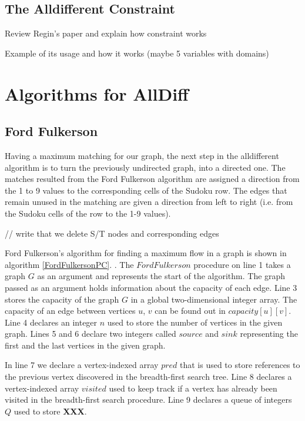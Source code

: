 \documentclass{l4proj}
\begin{document}
\section{The Alldifferent Constraint}
\noindent Review Regin’s paper and explain how constraint works \cite{regin1994filtering}

\noindent Example of  its usage and how it works (maybe 5 variables with domains)

 
\chapter{Algorithms for AllDiff}
\section{Ford Fulkerson}
Having a maximum matching for our graph, the next step in the alldifferent algorithm is to turn the previously undirected graph, into a directed one. The matches resulted from the Ford Fulkerson algorithm are assigned a direction from the 1 to 9 values to the corresponding cells of the Sudoku row. The edges that remain unused in the matching are given a direction from left to right (i.e. from the Sudoku cells of the row to the 1-9 values).

\noindent // write that we delete S/T nodes and corresponding edges

\noindent Ford Fulkerson's algorithm for finding a maximum flow in a graph is shown in algorithm \ref{FordFulkersonPC}. \cite{ford1956maximal}. The $Ford Fulkerson$ procedure on line 1 takes a graph $G$ as an argument and represents the start of the algorithm. The graph passed as an argument holds information about the capacity of each edge. Line 3 stores the capacity of the graph $G$ in a global two-dimensional integer array. The capacity of an edge between vertices $u$, $v$ can be found out in $capacity[u][v]$. Line 4 declares an integer $n$ used to store the number of vertices in the given graph. Lines 5 and 6 declare two integers called $source$ and $sink$ representing the first and the last vertices in the given graph.

\noindent In line 7 we declare a vertex-indexed array $pred$ that is used to store references to the previous vertex discovered in the breadth-first search tree. Line 8 declares a vertex-indexed array $visited$ used to keep track if a vertex has already been visited in the breadth-first search procedure. Line 9 declares a queue of integers $Q$ used to store \textbf{XXX}.
\end{document}
